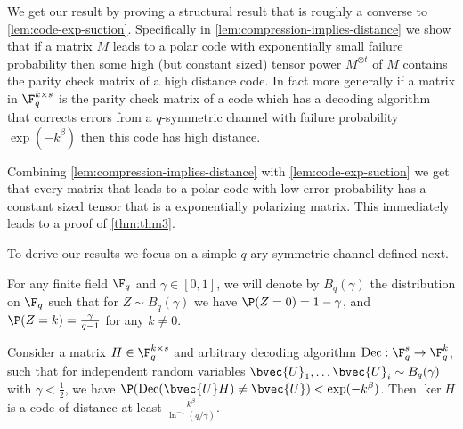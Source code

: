 \documentclass[11pt]{article}
\newcommand{\Dec}{\mathrm{Dec}}
\begin{document}
We get our result by proving a structural result that is roughly a converse to \cref{lem:code-exp-suction}.
Specifically in \cref{lem:compression-implies-distance} we show that if a matrix $M$ leads to a polar code with exponentially small failure probability then some high (but constant sized) tensor power $M^{\otimes t}$ of $M$ contains the parity check matrix of a high distance code. In fact more generally if a matrix in $\F_q^{k \times s}$ is the parity check matrix of a code which has a decoding algorithm that corrects errors from a $q$-symmetric channel with failure probability $\exp(-k^\beta)$ then this code has high distance.

Combining \cref{lem:compression-implies-distance} with \cref{lem:code-exp-suction} we get that every matrix that leads to a polar code with low error probability has a constant sized tensor that is a exponentially polarizing matrix. This immediately leads to a proof of \cref{thm:thm3}. 


To derive our results we focus on a simple $q$-ary symmetric channel defined next.

\begin{definition}
	\label{defn:q-ary-bernoulli}
	For any finite field $\F_q$ and $\gamma \in [0,1]$, we will denote by $B_{q}(\gamma)$ 
	the distribution on $\F_q$ such that for $Z \sim B_{q}(\gamma)$ we have $\P(Z = 0) = 1 - \gamma$, and $\P(Z = k) = \frac{\gamma}{q-1}$ for any $k\not=0$.
\end{definition}

\begin{lemma}
	\label{lem:compression-implies-distance}
	Consider a matrix $H \in \F_q^{k \times s}$ and arbitrary decoding algorithm $\Dec : \F_q^s \to \F_q^k$, such that for independent random variables $\bvec{U}_1, \ldots \bvec{U}_i \sim B_{q}(\gamma)$ with $\gamma < \frac{1}{2}$, we have $\P(\Dec(\bvec{U}H) \not= \bvec{U}) < \exp(-k^{\beta})$. Then $\ker H$ is a code of distance at least $\frac{k^{\beta}} {\ln^{-1}(q/\gamma)}$.
\end{lemma}
\end{document}
